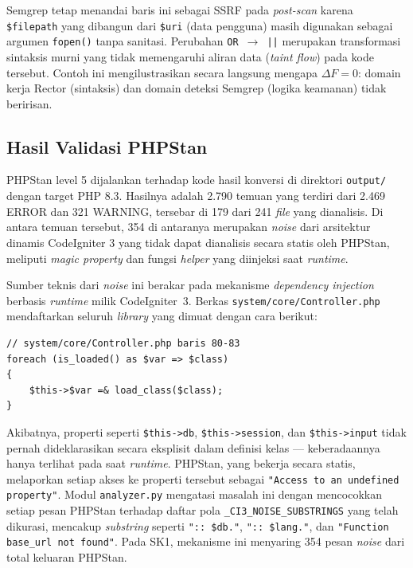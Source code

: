 Semgrep tetap menandai baris ini sebagai SSRF pada
\textit{post-scan} karena \texttt{\$filepath} yang dibangun
dari \texttt{\$uri} (data pengguna) masih digunakan sebagai
argumen \texttt{fopen()} tanpa sanitasi. Perubahan
\texttt{OR}~$\rightarrow$~\texttt{||} merupakan transformasi
sintaksis murni yang tidak memengaruhi aliran data
(\textit{taint flow}) pada kode tersebut. Contoh ini
mengilustrasikan secara langsung mengapa $\Delta F = 0$:
domain kerja Rector (sintaksis) dan domain deteksi Semgrep
(logika keamanan) tidak beririsan.

\subsection{Hasil Validasi PHPStan}

PHPStan level 5 dijalankan terhadap kode hasil konversi di direktori \texttt{output/} dengan target PHP 8.3. Hasilnya adalah 2.790 temuan yang terdiri dari 2.469 ERROR dan 321 WARNING, tersebar di 179 dari 241 \textit{file} yang dianalisis. Di antara temuan tersebut, 354 di antaranya merupakan \textit{noise} dari arsitektur dinamis CodeIgniter 3 yang tidak dapat dianalisis secara statis oleh PHPStan, meliputi \textit{magic property} dan fungsi \textit{helper} yang diinjeksi saat \textit{runtime}.

Sumber teknis dari \textit{noise} ini berakar pada mekanisme
\textit{dependency injection} berbasis \textit{runtime} milik
CodeIgniter~3. Berkas \texttt{system/core/\allowbreak Controller.php}
mendaftarkan seluruh \textit{library} yang dimuat dengan cara
berikut:

\begin{lstlisting}[style=promptstyle]
// system/core/Controller.php baris 80-83
foreach (is_loaded() as $var => $class)
{
    $this->$var =& load_class($class);
}
\end{lstlisting}

Akibatnya, properti seperti \texttt{\$this->db},
\texttt{\$this->session}, dan \texttt{\$this->input} tidak
pernah dideklarasikan secara eksplisit dalam definisi kelas ---
keberadaannya hanya terlihat pada saat \textit{runtime}.
PHPStan, yang bekerja secara statis, melaporkan setiap akses
ke properti tersebut sebagai \texttt{"Access to an undefined
property"}. Modul \texttt{analyzer.py} mengatasi masalah ini
dengan mencocokkan setiap pesan PHPStan terhadap daftar pola
\texttt{\_CI3\_NOISE\_SUBSTRINGS} yang telah dikurasi, mencakup
\textit{substring} seperti \texttt{"::~\$db."}, 
\texttt{"::~\$lang."}, dan \texttt{"Function base\_url not found"}.
Pada SK1, mekanisme ini menyaring 354 pesan \textit{noise}
dari total keluaran PHPStan.

